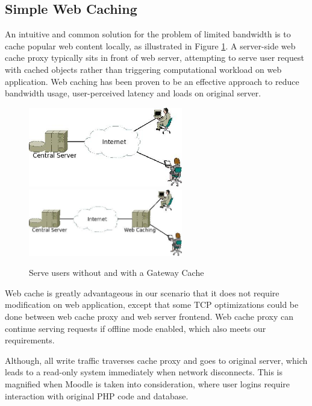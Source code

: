 
\subsection{Simple Web Caching}
An intuitive and common solution for the problem of limited bandwidth is to cache popular web content locally, as illustrated in Figure \ref{with_cache}.
A server-side web cache proxy typically sits in front of web server, attempting to serve user request with cached objects rather than triggering computational workload on web application. Web caching has been proven to be an effective approach to reduce bandwidth usage, user-perceived latency and loads on original server\cite{davison2001web}.

\begin{figure}[h]
\centering
\includegraphics[width=0.6\textwidth]{../images/without_caching.jpeg}
\includegraphics[width=0.6\textwidth]{../images/with_caching.jpeg}
\caption{Serve users without and with a Gateway Cache}
\label{with_cache}
\end{figure}

Web cache is greatly advantageous in our scenario that it does not require modification on web application, except that some TCP optimizations could be done between web cache proxy and web server frontend. Web cache proxy can continue serving requests if offline mode enabled, which also meets our requirements.

Although, all write traffic traverses cache proxy and goes to original server, which leads to a read-only system immediately when network disconnects. This is magnified when Moodle is taken into consideration, where user logins require interaction with original PHP code and database.


